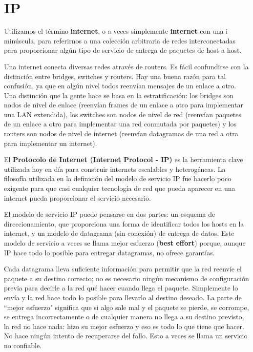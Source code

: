 \section{IP}
Utilizamos el término \textbf{internet}, o a veces simplemente \textbf{internet} con una i minúscula, para referirnos a una colección arbitraria de redes interconectadas para proporcionar algún tipo de servicio de entrega de paquetes de host a host.

Una internet conecta diversas redes através de routers. Es fácil confundirse con la distinción entre bridges, switches y routers. Hay una buena razón para tal confusión, ya que en algún nivel todos reenvían mensajes de un enlace a otro. Una distinción que la gente hace se basa en la estratificación: los bridges son nodos de nivel de enlace (reenvían frames de un enlace a otro para implementar una LAN extendida), los switches son nodos de nivel de red (reenvían paquetes de un enlace a otro para implementar una red conmutada por paquetes) y los routers son nodos de nivel de internet (reenvían datagramas de una red a otra para implementar un internet).

El \textbf{Protocolo de Internet (Internet Protocol - IP)} es la herramienta clave utilizada hoy en día para construir internets escalables y heterogéneas.
La filosofía utilizada en la definición del modelo de servicio IP fue hacerlo poco exigente para que casi cualquier tecnología de red que pueda aparecer en una internet pueda proporcionar el servicio necesario.

El modelo de servicio IP puede pensarse en dos partes: un esquema de direccionamiento, que proporciona una forma de identificar todos los hosts en la internet, y un modelo de datagrama (sin conexión) de entrega de datos. Este modelo de servicio a veces se llama mejor esfuerzo (\textbf{best effort}) porque, aunque IP hace todo lo posible para entregar datagramas, no ofrece garantías.

Cada datagrama lleva suficiente información para permitir que la red reenvíe el paquete a su destino correcto; no es necesario ningún mecanismo de configuración previa para decirle a la red qué hacer cuando llega el paquete. Simplemente lo envía y la red hace todo lo posible para llevarlo al destino deseado. La parte de ``mejor esfuerzo" significa que si algo sale mal y el paquete se pierde, se corrompe, se entrega incorrectamente o de cualquier manera no llega a su destino previsto, la red no hace nada: hizo su mejor esfuerzo y eso es todo lo que tiene que hacer. No hace ningún intento de recuperarse del fallo. Esto a veces se llama un servicio no confiable.

